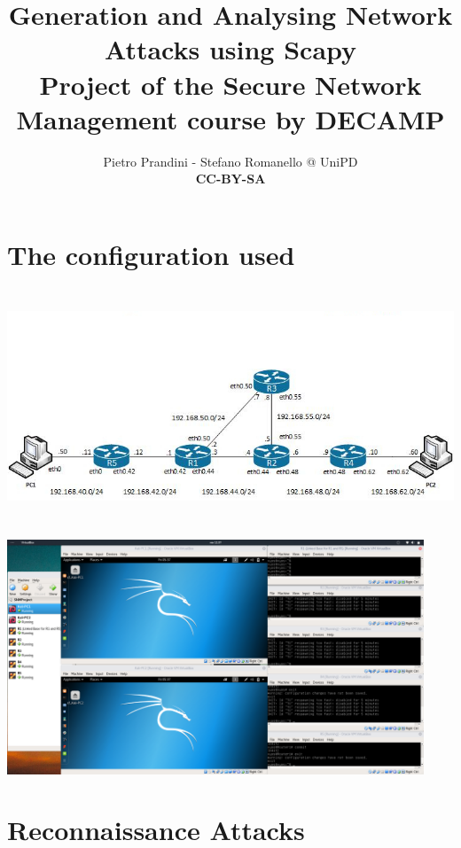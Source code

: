 \documentclass[10pt,a4paper]{article}
\author{Pietro Prandini - Stefano Romanello @ UniPD\\{\textbf{\tiny{CC-BY-SA}}}}
\title{Generation and Analysing Network Attacks using Scapy\\{\small{Project of the Secure Network Management course by DECAMP}}}
\begin{document}
\maketitle %

\section{The configuration used}
\begin{center}
\includegraphics[height=7cm]{img/NetworkConfiguration.jpg}\par
\includegraphics[height=7cm]{img/GlobalConfiguration.png}\par
\end{center}


\clearpage

\section{Reconnaissance Attacks}
%

\clearpage
\end{document}
